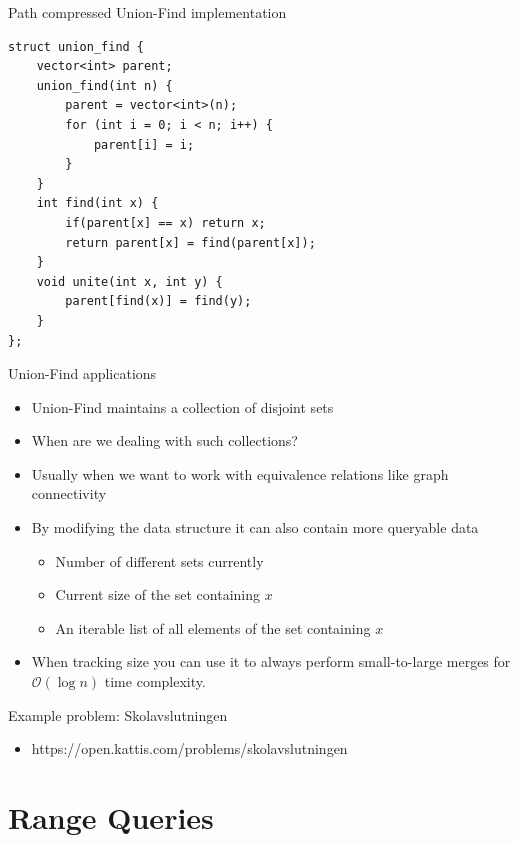 \documentclass{beamer}
\begin{document}
\begin{frame}{Path compressed Union-Find implementation}
    \begin{verbatim}
struct union_find {
    vector<int> parent;
    union_find(int n) {
        parent = vector<int>(n);
        for (int i = 0; i < n; i++) {
            parent[i] = i;
        }
    }
    int find(int x) {
        if(parent[x] == x) return x;
        return parent[x] = find(parent[x]);
    }
    void unite(int x, int y) {
        parent[find(x)] = find(y);
    }
};
    \end{verbatim}
\end{frame}

\begin{frame}[plain]{Union-Find applications}
    \vspace{30pt}
    \begin{itemize}
        \item<1-> Union-Find maintains a collection of disjoint sets
        \item<2-> When are we dealing with such collections?
        \item<3-> Usually when we want to work with equivalence relations like graph connectivity
        \item<4-> By modifying the data structure it can also contain more queryable data
        \begin{itemize}
            \item<5-> Number of different sets currently
            \item<6-> Current size of the set containing $x$
            \item<7-> An iterable list of all elements of the set containing $x$
        \end{itemize}
        \item<8-> When tracking size you can use it to always perform small-to-large merges for $\mathcal{O}(\log n)$ time complexity.
    \end{itemize}
\end{frame}

\begin{frame}[plain]{Example problem: Skolavslutningen}
    \begin{itemize}
        \item https://open.kattis.com/problems/skolavslutningen
    \end{itemize}
\end{frame}

\section*{Range Queries}
\end{document}
